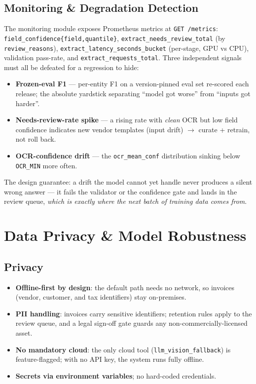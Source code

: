 \documentclass[12pt,a4paper]{article}
\begin{document}
\subsection{Monitoring \& Degradation Detection}

The monitoring module exposes Prometheus metrics at \texttt{GET /metrics}:
\texttt{field\_confidence\{field,quantile\}}, \texttt{extract\_needs\_review\_total}
(by \texttt{review\_reasons}), \texttt{extract\_latency\_seconds\_bucket} (per-stage,
GPU vs CPU), validation pass-rate, and \texttt{extract\_requests\_total}. Three
independent signals must all be defeated for a regression to hide:
\begin{itemize}\setlength\itemsep{0.15em}
  \item \textbf{Frozen-eval F1} --- per-entity F1 on a version-pinned eval set re-scored each release; the absolute yardstick separating ``model got worse'' from ``inputs got harder''.
  \item \textbf{Needs-review-rate spike} --- a rising rate with \emph{clean} OCR but low field confidence indicates new vendor templates (input drift) $\to$ curate + retrain, not roll back.
  \item \textbf{OCR-confidence drift} --- the \texttt{ocr\_mean\_conf} distribution sinking below \texttt{OCR\_MIN} more often.
\end{itemize}
The design guarantee: a drift the model cannot yet handle never produces a silent wrong
answer --- it fails the validator or the confidence gate and lands in the review queue,
\emph{which is exactly where the next batch of training data comes from}.

\section{Data Privacy \& Model Robustness}

\subsection{Privacy}

\begin{itemize}\setlength\itemsep{0.15em}
  \item \textbf{Offline-first by design}: the default path needs no network, so invoices (vendor, customer, and tax identifiers) stay on-premises.
  \item \textbf{PII handling}: invoices carry sensitive identifiers; retention rules apply to the review queue, and a legal sign-off gate guards any non-commercially-licensed asset.
  \item \textbf{No mandatory cloud}: the only cloud tool (\texttt{llm\_vision\_fallback}) is feature-flagged; with no API key, the system runs fully offline.
  \item \textbf{Secrets via environment variables}; no hard-coded credentials.
\end{itemize}
\end{document}
